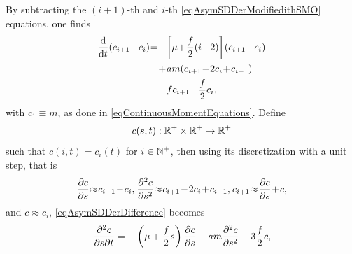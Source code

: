                 By subtracting the $(i+1)$-th and $i$-th \eqref{eqAsymSDDerModifiedithSMO} equations, one finds
                \begin{equation}
                    \SpazMate{1}{1}{1}
                    \begin{aligned}
                        \derT{}t(c_{i+1}-c_i)=
                        &-\left[\mu+\frac f2(i-2)\right](c_{i+1}-c_i)\\
                        &+am(c_{i+1}-2c_i+c_{i-1})\\
                        &-fc_{i+1}-\frac f2c_i,
                    \end{aligned}
                    \label{eqAsymSDDerDifference}
                \end{equation}
                with $c_1\equiv m$, as done in \eqref{eqContinuousMomentEquations}. Define $$c(s,t):\mathbb R^+\times\mathbb R^+\to\mathbb R^+$$ such that $c(i,t)=c_i(t)$ for $i\in\mathbb N^+$, then using its discretization with a unit step, that is
                \begin{equation*}
                    \SpazMate{1}{1}{1}
                    \derP cs\approx c_{i+1}-c_i,\;\;\;
                    \derP{^2c}{s^2}\approx c_{i+1}-2c_i+c_{i-1},\;\;\;
                    c_{i+1}\approx\derP cs+c,
                    \label{eqDiscretizationCntSizeDistribution}
                \end{equation*}
                and\footnotemark{} $c\approx c_i$, \eqref{eqAsymSDDerDifference} becomes
                \begin{equation}
                    \frac{\partial^2c}{\partial s\partial t}=
                    -\left(\mu+\frac f2s\right)\frac{\partial c}{\partial s}
                    -am\frac{\partial^2c}{\partial s^2}-3\frac f2c,
                    \label{eqAsymSDDerDiscretized}
                \end{equation}
